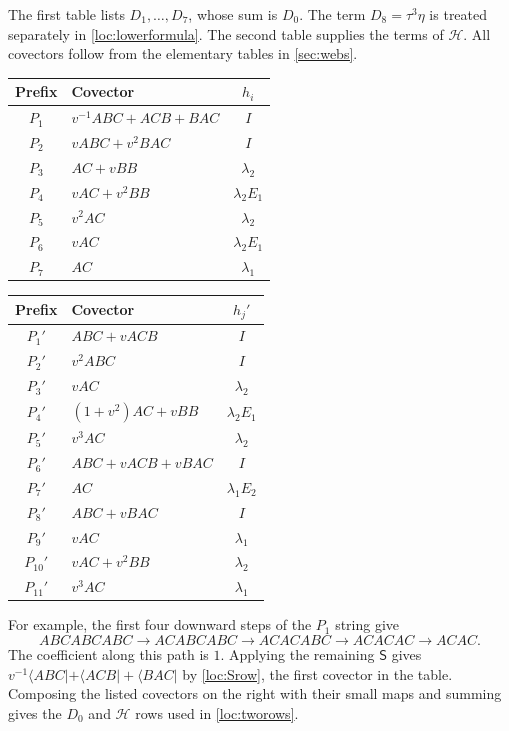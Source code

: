 \documentclass[a4paper,11pt]{amsart}
\newcommand{\tpar}{v}
\numberwithin{equation}{subsection}
\theoremstyle{plain}
\theoremstyle{definition}
\theoremstyle{remark}
\begin{document}
The first table lists $D_1,\ldots,D_7$, whose sum is $D_0$.
The term $D_8=\tau^3\eta$ is treated separately in
\autoref{loc:lowerformula}. The second table supplies the terms of
$\mathcal H$. All covectors follow from the elementary tables in
\autoref{sec:webs}.
\begin{center}\small
\begin{minipage}[t]{.47\linewidth}\vspace{0pt}\centering
\begin{tabular}{@{}clc@{}}\toprule
Prefix&Covector&$h_i$\\\midrule
$P_1$&$\tpar^{-1} ABC+ACB+BAC$&$I$\\
$P_2$&$\tpar ABC+\tpar^2BAC$&$I$\\
$P_3$&$AC+\tpar BB$&$\lambda_2$\\
$P_4$&$\tpar AC+\tpar^2BB$&$\lambda_2E_1$\\
$P_5$&$\tpar^2AC$&$\lambda_2$\\
$P_6$&$\tpar AC$&$\lambda_2E_1$\\
$P_7$&$AC$&$\lambda_1$\\\bottomrule
\end{tabular}
\end{minipage}\hfill
\begin{minipage}[t]{.51\linewidth}\vspace{0pt}\centering
\begin{tabular}{@{}clc@{}}\toprule
Prefix&Covector&$h_j'$\\\midrule
$P_1'$&$ABC+\tpar ACB$&$I$\\
$P_2'$&$\tpar^2ABC$&$I$\\
$P_3'$&$\tpar AC$&$\lambda_2$\\
$P_4'$&$(1+\tpar^2)AC+\tpar BB$&$\lambda_2E_1$\\
$P_5'$&$\tpar^3AC$&$\lambda_2$\\
$P_6'$&$ABC+\tpar ACB+\tpar BAC$&$I$\\
$P_7'$&$AC$&$\lambda_1E_2$\\
$P_8'$&$ABC+\tpar BAC$&$I$\\
$P_9'$&$\tpar AC$&$\lambda_1$\\
$P_{10}'$&$\tpar AC+\tpar^2BB$&$\lambda_2$\\
$P_{11}'$&$\tpar^3AC$&$\lambda_1$\\\bottomrule
\end{tabular}
\end{minipage}
\end{center}

For example, the first four downward steps of the $P_1$ string give
\[
ABCABCABC\to ACABCABC\to ACACABC\to ACACAC\to ACAC.
\]
The coefficient along this path is $1$. Applying the remaining
$\mathsf S$ gives
$\tpar^{-1}\langle ABC|+\langle ACB|+\langle BAC|$ by
\autoref{loc:Srow}, the first covector in the table.
Composing the listed covectors on the right with their small maps
and summing gives the $D_0$ and $\mathcal H$ rows used in
\autoref{loc:tworows}.
\end{document}
